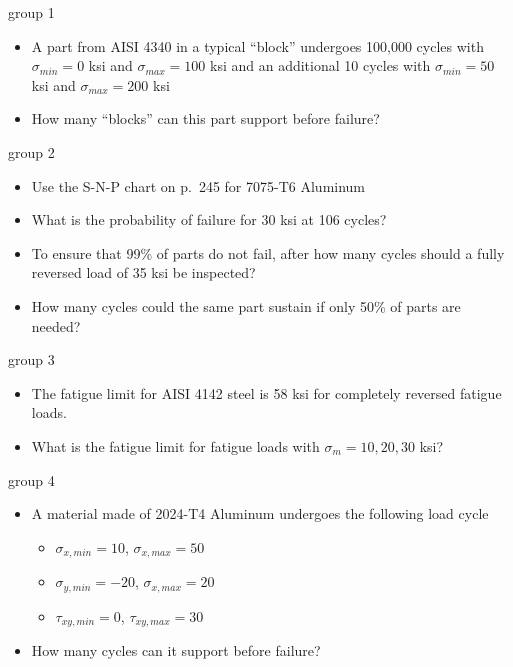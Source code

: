 \documentclass[
  letterpaper,
  ignorenonframetext,
  aspectratio=43,
  handout,
  12pt]{beamer}
\providecommand{\tightlist}{%
  \setlength{\itemsep}{0pt}\setlength{\parskip}{0pt}}
\providecommand{\tightlist}{%
\setlength{\itemsep}{0pt}\setlength{\parskip}{0pt}}
\begin{document}
\begin{frame}{group 1}
\protect\hypertarget{group-1}{}
\begin{itemize}
\tightlist
\item
  A part from AISI 4340 in a typical ``block'' undergoes 100,000 cycles
  with \(\sigma_{min} = 0\) ksi and \(\sigma_{max} = 100\) ksi and an
  additional 10 cycles with \(\sigma_{min} = 50\) ksi and
  \(\sigma_{max} = 200\) ksi
\item
  How many ``blocks'' can this part support before failure?
\end{itemize}
\end{frame}

\begin{frame}{group 2}
\protect\hypertarget{group-2}{}
\begin{itemize}
\tightlist
\item
  Use the S-N-P chart on p.~245 for 7075-T6 Aluminum
\item
  What is the probability of failure for 30 ksi at 106 cycles?
\item
  To ensure that 99\% of parts do not fail, after how many cycles should
  a fully reversed load of 35 ksi be inspected?
\item
  How many cycles could the same part sustain if only 50\% of parts are
  needed?
\end{itemize}
\end{frame}

\begin{frame}{group 3}
\protect\hypertarget{group-3}{}
\begin{itemize}
\tightlist
\item
  The fatigue limit for AISI 4142 steel is 58 ksi for completely
  reversed fatigue loads.
\item
  What is the fatigue limit for fatigue loads with
  \(\sigma_m = 10, 20, 30\) ksi?
\end{itemize}
\end{frame}

\begin{frame}{group 4}
\protect\hypertarget{group-4}{}
\begin{itemize}
\tightlist
\item
  A material made of 2024-T4 Aluminum undergoes the following load cycle

  \begin{itemize}
  \tightlist
  \item
    \(\sigma_{x, min}=10\), \(\sigma_{x, max} = 50\)
  \item
    \(\sigma_{y, min}=-20\), \(\sigma_{x, max} = 20\)
  \item
    \(\tau_{xy, min}=0\), \(\tau_{xy, max} = 30\)
  \end{itemize}
\item
  How many cycles can it support before failure?
\end{itemize}
\end{frame}
\end{document}
